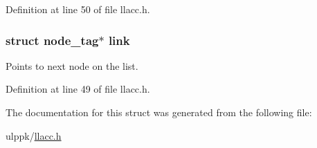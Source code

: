 Definition at line 50 of file llacc.\-h.

\hypertarget{structnode__tag_a0177d8b8e657780d13898a315db2c5ab}{
\subsubsection[{link}]{\setlength{\rightskip}{0pt plus 5cm}struct {\bf node\-\_\-tag}$\ast$ link}}\label{structnode__tag_a0177d8b8e657780d13898a315db2c5ab}


Points to next node on the list. 



Definition at line 49 of file llacc.\-h.



The documentation for this struct was generated from the following file\-:\begin{DoxyCompactItemize}
\item 
ulppk/\hyperlink{llacc_8h}{llacc.\-h}\end{DoxyCompactItemize}
